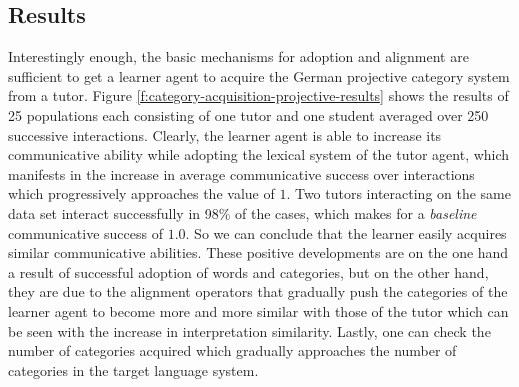 \subsection{Results}
Interestingly enough, the basic mechanisms for adoption and alignment
are sufficient to get a learner agent to acquire the German projective category 
system from a tutor. Figure \ref{f:category-acquisition-projective-results}
shows the results of 25 populations each consisting of one tutor and one student
averaged over 250 successive interactions. Clearly, the learner agent is able to increase
its communicative ability while adopting the lexical system of the tutor agent,
which manifests in the increase in average communicative success
over interactions which progressively approaches the value of $1$. Two tutors 
interacting on the same data set interact successfully in 98\% of the cases, which
makes for a \emph{baseline} communicative success of $1.0$. So we can conclude that
the learner easily acquires similar communicative abilities.
These positive developments are on the one hand a result of
successful adoption of words and categories, but on the other hand, they are due to
the alignment operators that gradually push the categories of the learner agent 
to become more and more similar with those of the tutor which can be seen with 
the increase in interpretation similarity. Lastly, one can check the number of categories acquired
which gradually approaches the number of categories in the target language system.

